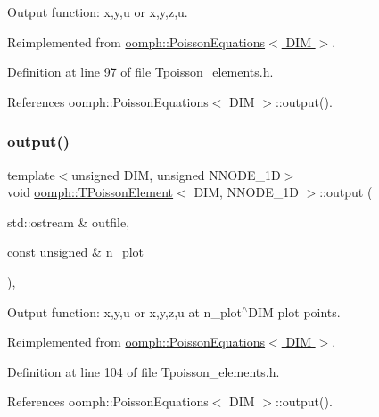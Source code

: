 Output function\+: x,y,u or x,y,z,u. 



Reimplemented from \hyperlink{classoomph_1_1PoissonEquations_a2417afb77d428846d7a1eada342ea8bb}{oomph\+::\+Poisson\+Equations$<$ D\+I\+M $>$}.



Definition at line 97 of file Tpoisson\+\_\+elements.\+h.



References oomph\+::\+Poisson\+Equations$<$ D\+I\+M $>$\+::output().

\mbox{\label{classoomph_1_1TPoissonElement_a8a9139cd1265c160c2c88df86fae8b6c}} 
\subsubsection{\texorpdfstring{output()}{output()}\hspace{0.1cm}{\footnotesize\ttfamily [2/4]}}
{\footnotesize\ttfamily template$<$unsigned D\+IM, unsigned N\+N\+O\+D\+E\+\_\+1D$>$ \\
void \hyperlink{classoomph_1_1TPoissonElement}{oomph\+::\+T\+Poisson\+Element}$<$ D\+IM, N\+N\+O\+D\+E\+\_\+1D $>$\+::output (\begin{DoxyParamCaption}\item[{std\+::ostream \&}]{outfile,  }\item[{const unsigned \&}]{n\+\_\+plot }\end{DoxyParamCaption})\hspace{0.3cm}{\ttfamily [inline]}, {\ttfamily [virtual]}}



Output function\+: x,y,u or x,y,z,u at n\+\_\+plot$^\wedge$\+D\+IM plot points. 



Reimplemented from \hyperlink{classoomph_1_1PoissonEquations_a6683dd0afc16bfddf4e79b6e0e449d43}{oomph\+::\+Poisson\+Equations$<$ D\+I\+M $>$}.



Definition at line 104 of file Tpoisson\+\_\+elements.\+h.



References oomph\+::\+Poisson\+Equations$<$ D\+I\+M $>$\+::output().

\mbox{\label{classoomph_1_1TPoissonElement_a289c196b8a84337341e306887c82e3db}} 
